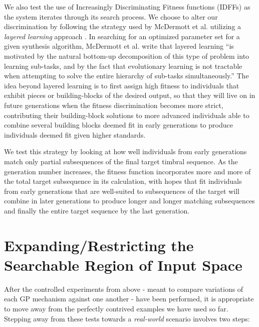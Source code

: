 \documentclass[a4paper,12pt]{report} 	%
\numberwithin{figure}{chapter}
\numberwithin{table}{chapter}
\numberwithin{equation}{chapter}
\begin{document}
\begin{flushleft}
We also test the use of Increasingly Discriminating Fitness functions (IDFFs) as the system iterates through its search process. We choose to alter our discrimination by following the strategy used by McDermott et al. utilizing a \emph{layered learning} approach \cite[p. 3]{McDermott:2006jd}. In searching for an optimized parameter set for a given synthesis algorithm, McDermott et al. write that layered learning ``is motivated by the natural bottom-up decomposition of this type of problem into learning sub-tasks, and by the fact that evolutionary learning is not tractable when attempting to solve the entire hierarchy of sub-tasks simultaneously.'' The idea beyond layered learning is to first assign high fitness to individuals that exhibit pieces or building-blocks of the desired output, so that they will live on in future generations when the fitness discrimination becomes more strict, contributing their building-block solutions to more advanced individuals able to combine several building blocks deemed fit in early generations to produce individuals deemed fit given higher standards.

We test this strategy by looking at how well individuals from early generations match only partial subsequences of the final target timbral sequence. As the generation number increases, the fitness function incorporates more and more of the total target subsequence in its calculation, with hopes that fit individuals from early generations that are well-suited to subsequences of the target will combine in later generations to produce longer and longer matching subsequences and finally the entire target sequence by the last generation.

\section{Expanding/Restricting the Searchable Region of Input Space}

After the controlled experiments from above - meant to compare variations of each GP mechanism against one another - have been performed, it is appropriate to move away from the perfectly contrived examples we have used so far. Stepping away from these tests towards a \emph{real-world} scenario involves two steps:


\end{flushleft}
\end{document}
